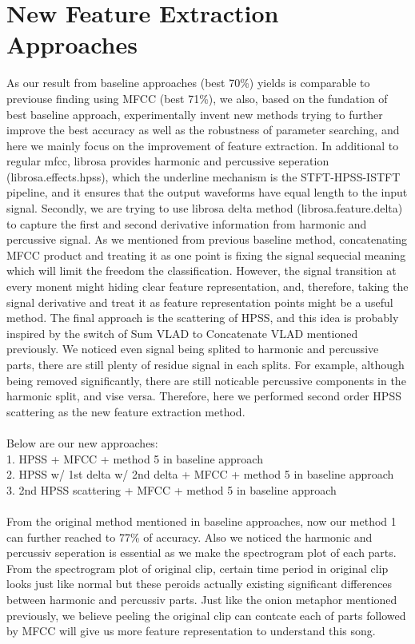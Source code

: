 \documentclass[final]{siamltexmm}
\begin{document}
\section{New Feature Extraction Approaches}
As our result from baseline approaches (best 70\%) yields is comparable to previouse finding using MFCC (best 71\%), we also, based on the fundation of best baseline approach, experimentally invent new methods trying to further improve the best accuracy as well as the robustness of parameter searching, and here we mainly focus on the improvement of feature extraction. In additional to regular mfcc, librosa provides harmonic and percussive seperation (librosa.effects.hpss), which the underline mechanism is the STFT-HPSS-ISTFT pipeline, and it ensures that the output waveforms have equal length to the input signal. Secondly, we are trying to use librosa delta method (librosa.feature.delta) to capture the first and second derivative information from harmonic and percussive signal. As we mentioned from previous baseline method, concatenating MFCC product and treating it as one point is fixing the signal sequecial meaning which will limit the freedom the classification. However, the signal transition at every monent might hiding clear feature representation, and, therefore, taking the signal derivative and treat it as feature representation points might be a useful method. The final approach is the scattering of HPSS, and this idea is probably inspired by the switch of Sum VLAD to Concatenate VLAD mentioned previously. We noticed even signal being splited to harmonic and percussive parts, there are still plenty of residue signal in each splits. For example, although being removed significantly, there are still noticable percussive components in the harmonic split, and vise versa. Therefore, here we performed second order HPSS scattering as the new feature extraction method.
\\\\Below are our new approaches:
\\ 1. HPSS + MFCC + method 5 in baseline approach
\\ 2. HPSS w/ 1st delta w/ 2nd delta + MFCC + method 5 in baseline approach
\\ 3. 2nd HPSS scattering + MFCC + method 5 in baseline approach
\\
\\From the original method mentioned in baseline approaches, now our method 1 can further reached to 77\% of accuracy. Also we noticed the harmonic and percussiv seperation is essential as we make the spectrogram plot of each parts. From the spectrogram plot of original clip, certain time period in original clip looks just like normal but these peroids actually existing significant differences between harmonic and percussiv parts. Just like the onion metaphor mentioned previously, we believe peeling the original clip can contcate each of parts followed by MFCC will give us more feature representation to understand this song.
\\
\end{document}
